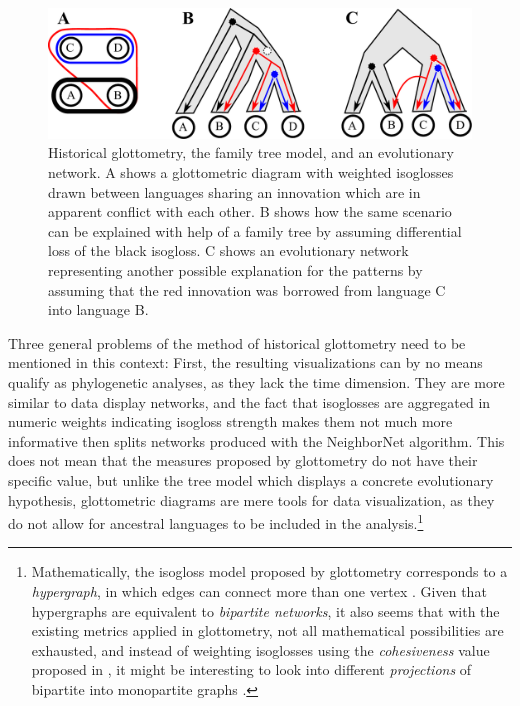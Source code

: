 \documentclass[svgnames,12pt]{scrartcl}
\begin{document}
{{\begin{figure}[htb]
  \centering
  \includegraphics[width=1\textwidth]{images/glottometrie.pdf}
  \caption{Historical glottometry, the family tree model, and an evolutionary network. A shows a
  glottometric diagram with
  weighted isoglosses drawn between languages sharing an innovation which are in apparent conflict
  with each other. B shows how the same scenario can be explained with help of a family tree by
  assuming differential loss of the black isogloss. C shows an evolutionary network representing
  another possible explanation for the patterns by assuming that the red innovation was borrowed
  from language C into language B.}
  \label{fig:glotto}
\end{figure}
 

Three general problems of the method of historical glottometry need to be mentioned in this context:
First, the resulting visualizations can by no means qualify as phylogenetic analyses, as they lack
the time dimension. They are more similar to data display networks, and the fact that isoglosses
are aggregated in numeric weights indicating isogloss strength makes them not much more informative then splits networks
produced with the NeighborNet algorithm. 
This does not mean that the measures proposed by
glottometry do not have their specific value, but unlike the tree model which displays a concrete
evolutionary hypothesis, glottometric diagrams are mere tools for data visualization, as they do not
allow for ancestral languages to be included in the analysis.\footnote{Mathematically, the isogloss model proposed by glottometry
corresponds to a \emph{hypergraph}, in which edges can connect more than one vertex
\citep[122f]{Newman2010}. Given that hypergraphs are equivalent to \emph{bipartite networks}, it also seems
that with the existing metrics applied in glottometry, not all mathematical possibilities are
exhausted, and instead of weighting isoglosses using the \emph{cohesiveness} value proposed in
\citep{Francois2014}, it might be interesting to look into different \emph{projections} of bipartite into
monopartite graphs \citep[124f]{Newman2010}.} 
 
}}
\end{document}

